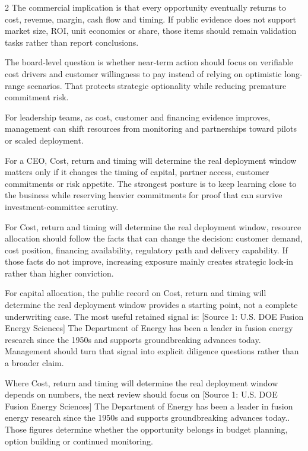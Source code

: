 \documentclass[10pt,a4paper]{article}
\begin{document}
\begin{multicols}{2}
{\small The commercial implication is that every opportunity eventually returns to cost, revenue, margin, cash flow and timing. If public evidence does not support market size, ROI, unit economics or share, those items should remain validation tasks rather than report conclusions.}\par
{\small The board-level question is whether near-term action should focus on verifiable cost drivers and customer willingness to pay instead of relying on optimistic long-range scenarios. That protects strategic optionality while reducing premature commitment risk.}\par
{\small For leadership teams, as cost, customer and financing evidence improves, management can shift resources from monitoring and partnerships toward pilots or scaled deployment.}\par
{\small For a CEO, Cost, return and timing will determine the real deployment window matters only if it changes the timing of capital, partner access, customer commitments or risk appetite. The strongest posture is to keep learning close to the business while reserving heavier commitments for proof that can survive investment-committee scrutiny.}\par
{\small For Cost, return and timing will determine the real deployment window, resource allocation should follow the facts that can change the decision: customer demand, cost position, financing availability, regulatory path and delivery capability. If those facts do not improve, increasing exposure mainly creates strategic lock-in rather than higher conviction.}\par
{\small For capital allocation, the public record on Cost, return and timing will determine the real deployment window provides a starting point, not a complete underwriting case. The most useful retained signal is: [Source 1: U.S. DOE Fusion Energy Sciences] The Department of Energy has been a leader in fusion energy research since the 1950s and supports groundbreaking advances today. Management should turn that signal into explicit diligence questions rather than a broader claim.}\par
{\small Where Cost, return and timing will determine the real deployment window depends on numbers, the next review should focus on [Source 1: U.S. DOE Fusion Energy Sciences] The Department of Energy has been a leader in fusion energy research since the 1950s and supports groundbreaking advances today.. Those figures determine whether the opportunity belongs in budget planning, option building or continued monitoring.}\par
\end{multicols}
\label{chap:6:end}
\end{document}

